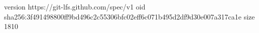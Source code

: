 version https://git-lfs.github.com/spec/v1
oid sha256:3f491498800ff9bd496c2c55306bfc02eff6c071b495d2df9d30e007a317ca1e
size 1810
